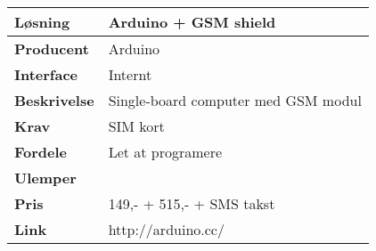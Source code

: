\begin{table}[!htbp] \centering
	\label{tab:GSM3}
\begin{tabular}{|p{6cm}|p{8cm}|}
	\hline
		\textbf{Løsning}				&Arduino + GSM shield \\ \hline
		\textbf{Producent} 			&Arduino \\ \hline
		\textbf{Interface} 			&Internt \\ \hline
		\textbf{Beskrivelse} 		&Single-board computer med GSM modul\\ \hline
		\textbf{Krav} 				&SIM kort \\ \hline
		\textbf{Fordele}				&Let at programere \\ \hline
		\textbf{Ulemper} 			&\\ \hline
		\textbf{Pris} 				&149,- + 515,- + SMS takst\\ \hline
		\textbf{Link} 				&http://arduino.cc/ \\ \hline		
\end{tabular}
\end{table}